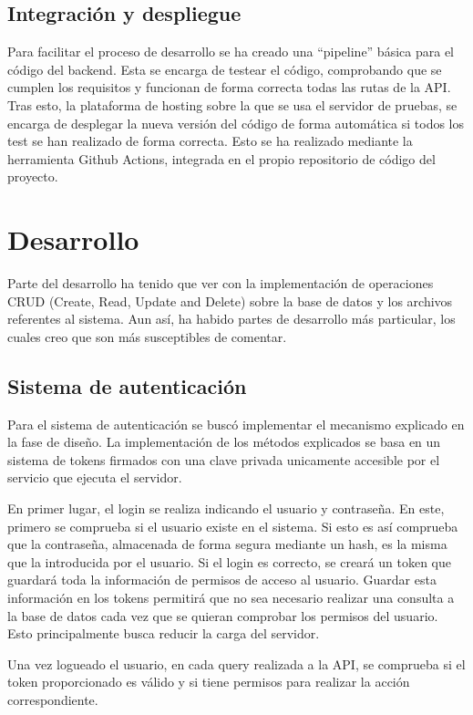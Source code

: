 \subsection{Integración y despliegue}

Para facilitar el proceso de desarrollo se ha creado una ``pipeline'' básica para el código del backend. Esta se encarga de testear el código, comprobando que se cumplen los requisitos y funcionan de forma correcta todas las rutas de la API. Tras esto, la plataforma de hosting sobre la que se usa el servidor de pruebas, se encarga de desplegar la nueva versión del código de forma automática si todos los test se han realizado de forma correcta. Esto se ha realizado mediante la herramienta Github Actions, integrada en el propio repositorio de código del proyecto.

\section{Desarrollo}

Parte del desarrollo ha tenido que ver con la implementación de operaciones CRUD (Create, Read, Update and Delete) sobre la base de datos y los archivos referentes al sistema. Aun así, ha habido partes de desarrollo más particular, los cuales creo que son más susceptibles de comentar.

\subsection{Sistema de autenticación}

Para el sistema de autenticación se buscó implementar el mecanismo explicado en la fase de diseño. La implementación de los métodos explicados se basa en un sistema de tokens firmados con una clave privada unicamente accesible por el servicio que ejecuta el servidor.

En primer lugar, el login se realiza indicando el usuario y contraseña. En este, primero se comprueba si el usuario existe en el sistema. Si esto es así comprueba que la contraseña, almacenada de forma segura mediante un hash, es la misma que la introducida por el usuario. Si el login es correcto, se creará un token que guardará toda la información de permisos de acceso al usuario. Guardar esta información en los tokens permitirá que no sea necesario realizar una consulta a la base de datos cada vez que se quieran comprobar los permisos del usuario. Esto principalmente busca reducir la carga del servidor.

Una vez logueado el usuario, en cada query realizada a la API, se comprueba si el token proporcionado es válido y si tiene permisos para realizar la acción correspondiente. 

